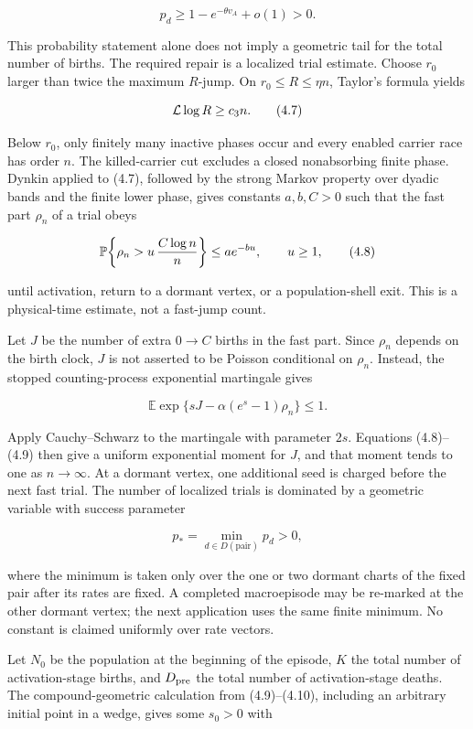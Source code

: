 \[
 p_d\ge1-e^{-\theta v_A}+o(1)>0.                       \tag{4.6}
\]

This probability statement alone does not imply a geometric tail for the
total number of births. The required repair is a localized trial
estimate. Choose \(r_0\) larger than twice the maximum \(R\)-jump. On
\(r_0\le R\le\eta n\), Taylor's formula yields

\[
                         {\cal L}\log R\ge c_3n.        \tag{4.7}
\]

Below \(r_0\), only finitely many inactive phases occur and every
enabled carrier race has order \(n\). The killed-carrier cut excludes a
closed nonabsorbing finite phase. Dynkin applied to (4.7), followed by
the strong Markov property over dyadic bands and the finite lower phase,
gives constants \(a,b,C>0\) such that the fast part \(\rho_n\) of a
trial obeys

\[
 \mathbb P\!\left\{\rho_n>u\,{C\log n\over n}\right\}
 \le ae^{-bu},\qquad u\ge1,                            \tag{4.8}
\]

until activation, return to a dormant vertex, or a population-shell
exit. This is a physical-time estimate, not a fast-jump count.

Let \(J\) be the number of extra \(0\to C\) births in the fast part.
Since \(\rho_n\) depends on the birth clock, \(J\) is not asserted to be
Poisson conditional on \(\rho_n\). Instead, the stopped counting-process
exponential martingale gives

\[
 \mathbb E\exp\{sJ-\alpha(e^s-1)\rho_n\}\le1.           \tag{4.9}
\]

Apply Cauchy--Schwarz to the martingale with parameter \(2s\). Equations
(4.8)--(4.9) then give a uniform exponential moment for \(J\), and that
moment tends to one as \(n\to\infty\). At a dormant vertex, one
additional seed is charged before the next fast trial. The number of
localized trials is dominated by a geometric variable with success
parameter

\[
 p_*=\min_{d\in D(\mathrm{pair})}p_d>0,                \tag{4.10}
\]

where the minimum is taken only over the one or two dormant charts of
the fixed pair after its rates are fixed. A completed macroepisode may
be re-marked at the other dormant vertex; the next application uses the
same finite minimum. No constant is claimed uniformly over rate vectors.

Let \(N_0\) be the population at the beginning of the episode, \(K\) the
total number of activation-stage births, and \(D_{\rm pre}\) the total
number of activation-stage deaths. The compound-geometric calculation
from (4.9)--(4.10), including an arbitrary initial point in a wedge,
gives some \(s_0>0\) with

